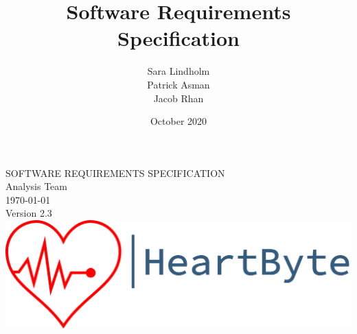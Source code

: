 \documentclass{scrreprt}
\title{Software Requirements Specification}
\author{Sara Lindholm \\ Patrick Asman \\ Jacob Rhan}
\date{October 2020}
\def\myversion{2.3}
\begin{document}
\begin{titlepage}
    \begin{center}
    \begin{bfseries}
        \Huge{SOFTWARE REQUIREMENTS SPECIFICATION}\\
        \vspace{1.5cm}
        \LARGE Analysis Team \\
        \vspace{1.5cm}
        \today\\
        \vspace{1.5cm}
        {Version \myversion}\\
        \vfill
        \includegraphics[width=\linewidth]{Pictures/logo.png} \\
    \end{bfseries}
    \end{center}
\end{titlepage}
\end{document}
